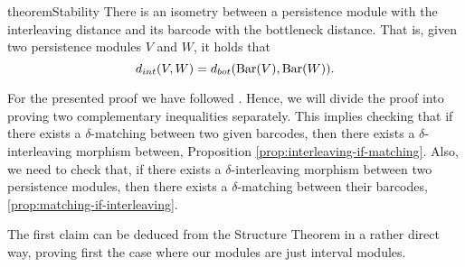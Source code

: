 \begin{restatable}[Stability]{theorem}{Stability} \cite[Theorem 2.2.8]{polterovich} \label{theorem:stability}
    There is an isometry between a persistence module with the interleaving distance and its barcode with the bottleneck distance. That is, given two persistence modules $ V $ and $ W $, it holds that
    $$ 
        d_{int} (V, W) = d_{bot} (\operatorname{Bar}(V), \operatorname{Bar}(W)).
    $$
\end{restatable}

For the presented proof we have followed \cite{polterovich}. Hence, we will divide the proof into proving two complementary inequalities separately. This implies checking that if there exists a $\delta$-matching between two given barcodes, then there exists a $\delta$-interleaving morphism between, Proposition \ref{prop:interleaving-if-matching}. Also, we need to check that, if there exists a $\delta$-interleaving morphism between two persistence modules, then there exists a $\delta$-matching between their barcodes, \ref{prop:matching-if-interleaving}.

The first claim can be deduced from the Structure Theorem in a rather direct way, proving first the case where our modules are just interval modules.

